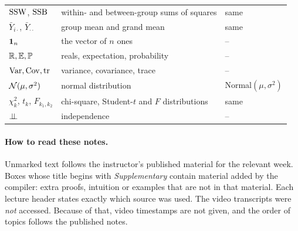 \begin{center}
\begin{tabular}{@{}p{3.4cm}p{7.2cm}p{4.6cm}@{}}
$\mathrm{SSW}$, $\mathrm{SSB}$ & within- and between-group sums of squares & same\\
$\bar Y_{i\cdot}$, $\bar Y_{\cdot\cdot}$ & group mean and grand mean & same\\
$\mathbf 1_n$ & the vector of $n$ ones & --\\
$\mathbb R,\mathbb E,\mathbb P$ & reals, expectation, probability & --\\
$\operatorname{Var},\operatorname{Cov},\operatorname{tr}$ & variance, covariance, trace & --\\
$\mathcal N(\mu,\sigma^2)$ & normal distribution & Normal$(\mu,\sigma^2)$\\
$\chi^2_k$, $t_k$, $F_{k_1,k_2}$ & chi-square, Student-$t$ and $F$ distributions & same\\
$\operatorname{\perp\!\!\!\perp}$ & independence & --\\\hline
\end{tabular}
\end{center}

\paragraph{How to read these notes.}
Unmarked text follows the instructor's published material for the relevant week.
Boxes whose title begins with \emph{Supplementary} contain material added by the
compiler: extra proofs, intuition or examples that are not in that material. Each lecture
header states exactly which source was used. The video transcripts were
\emph{not} accessed. Because of that, video timestamps are not given, and the
order of topics follows the published notes.
